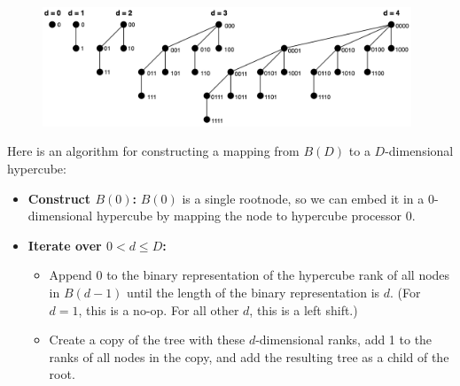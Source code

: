 \documentclass{article}
\begin{document}
\begin{figure}[htb]
  \begin{center}
  \includegraphics[width=110mm]{BinomialTreeEmbedding.png}
  \end{center}
\end{figure}

\quad Here is an algorithm for constructing a mapping from $B(D)$ to a $D$-dimensional hypercube:

\begin{itemize}
  \item \textbf{Construct $B(0)$:} $B(0)$ is a single rootnode, so we can embed it in a 0-dimensional hypercube by mapping the node to hypercube processor 0.
  \item \textbf{Iterate over $0 < d \leq D$:}
  \begin{itemize}
    \item Append $0$ to the binary representation of the hypercube rank of all nodes in $B(d - 1)$ until the length of the binary representation is $d$.
    (For $d = 1$, this is a no-op. For all other $d$, this is a left shift.)
    \item Create a copy of the tree with these $d$-dimensional ranks, add 1 to the ranks of all nodes in the copy, and add the resulting tree as a child of the root.
  \end{itemize}
\end{itemize}
\end{document}
